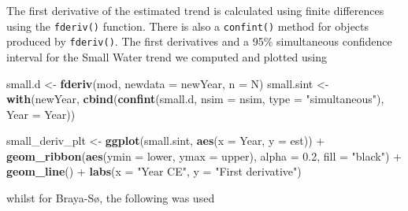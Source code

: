 \documentclass[12pt,]{article}
\newenvironment{Shaded}{\begin{snugshade}}{\end{snugshade}}
\newcommand{\KeywordTok}[1]{\textcolor[rgb]{0.13,0.29,0.53}{\textbf{{#1}}}}
\newcommand{\DataTypeTok}[1]{\textcolor[rgb]{0.13,0.29,0.53}{{#1}}}
\newcommand{\FloatTok}[1]{\textcolor[rgb]{0.00,0.00,0.81}{{#1}}}
\newcommand{\StringTok}[1]{\textcolor[rgb]{0.31,0.60,0.02}{{#1}}}
\newcommand{\NormalTok}[1]{{#1}}
\begin{document}
The first derivative of the estimated trend is calculated using finite
differences using the \texttt{fderiv()} function. There is also a
\texttt{confint()} method for objects produced by \texttt{fderiv()}. The
first derivatives and a 95\% simultaneous confidence interval for the
Small Water trend we computed and plotted using

\begin{Shaded}
\begin{Highlighting}[]
\NormalTok{small.d <-}\StringTok{ }\KeywordTok{fderiv}\NormalTok{(mod, }\DataTypeTok{newdata =} \NormalTok{newYear, }\DataTypeTok{n =} \NormalTok{N)}
\NormalTok{small.sint <-}\StringTok{ }\KeywordTok{with}\NormalTok{(newYear,}
                   \KeywordTok{cbind}\NormalTok{(}\KeywordTok{confint}\NormalTok{(small.d, }\DataTypeTok{nsim =} \NormalTok{nsim,}
                                 \DataTypeTok{type =} \StringTok{"simultaneous"}\NormalTok{),}
                         \DataTypeTok{Year =} \NormalTok{Year))}

\NormalTok{small_deriv_plt <-}\StringTok{ }\KeywordTok{ggplot}\NormalTok{(small.sint, }\KeywordTok{aes}\NormalTok{(}\DataTypeTok{x =} \NormalTok{Year, }\DataTypeTok{y =} \NormalTok{est)) +}
\StringTok{    }\KeywordTok{geom_ribbon}\NormalTok{(}\KeywordTok{aes}\NormalTok{(}\DataTypeTok{ymin =} \NormalTok{lower, }\DataTypeTok{ymax =} \NormalTok{upper), }\DataTypeTok{alpha =} \FloatTok{0.2}\NormalTok{,}
                \DataTypeTok{fill =} \StringTok{"black"}\NormalTok{) +}
\StringTok{    }\KeywordTok{geom_line}\NormalTok{() +}
\StringTok{    }\KeywordTok{labs}\NormalTok{(}\DataTypeTok{x =} \StringTok{"Year CE"}\NormalTok{, }\DataTypeTok{y =} \StringTok{"First derivative"}\NormalTok{)}
\end{Highlighting}
\end{Shaded}

whilst for Braya-Sø, the following was used
\end{document}
